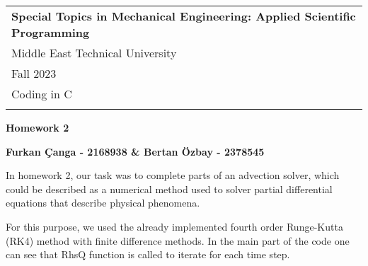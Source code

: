 \documentclass[a4paper,12pt]{article} %
\begin{document}



\thispagestyle{empty} %

\begin{tabular}{p{15.5cm}} %
{\large \bf Special Topics in Mechanical Engineering: Applied Scientific Programming}\\
Middle East Technical University\\ Fall 2023\\ Coding in C\\
\hline %
\\
\end{tabular} %

\vspace*{0.3cm} %

\begin{center} %
	{\Large \bf Homework 2} %
	\vspace{2mm}
	
	{\bf Furkan Çanga - 2168938  \&  Bertan Özbay - 2378545} %
		
\end{center}  

\vspace{0.4cm}



In homework 2, our task was to complete parts of an advection solver, which could be described as a numerical method used to solver partial differential equations that describe physical phenomena.

For this purpose, we used the already implemented fourth order Runge-Kutta (RK4) method with finite difference methods. In the main part of the code one can see that RhsQ function is called to iterate for each time step. 
\end{document}
